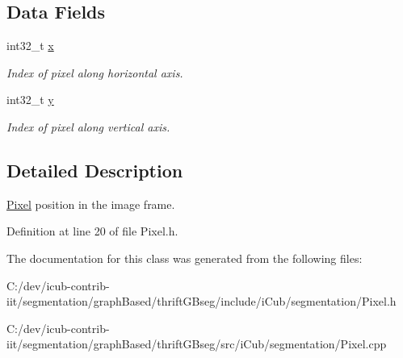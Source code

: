 \subsection*{Data Fields}
\begin{DoxyCompactItemize}
\item 
int32\+\_\+t \hyperlink{classyarp_1_1sig_1_1Pixel_a4d6a5b0c693035c4012aa15e8f8b4b64}{x}\label{classyarp_1_1sig_1_1Pixel_a4d6a5b0c693035c4012aa15e8f8b4b64}

\begin{DoxyCompactList}\small\item\em Index of pixel along horizontal axis. \end{DoxyCompactList}\item 
int32\+\_\+t \hyperlink{classyarp_1_1sig_1_1Pixel_a2ac1d9f1602f323fb9ca9fe62541aeb2}{y}\label{classyarp_1_1sig_1_1Pixel_a2ac1d9f1602f323fb9ca9fe62541aeb2}

\begin{DoxyCompactList}\small\item\em Index of pixel along vertical axis. \end{DoxyCompactList}\end{DoxyCompactItemize}


\subsection{Detailed Description}
\hyperlink{classyarp_1_1sig_1_1Pixel}{Pixel} position in the image frame. 

Definition at line 20 of file Pixel.\+h.



The documentation for this class was generated from the following files\+:\begin{DoxyCompactItemize}
\item 
C\+:/dev/icub-\/contrib-\/iit/segmentation/graph\+Based/thrift\+G\+Bseg/include/i\+Cub/segmentation/Pixel.\+h\item 
C\+:/dev/icub-\/contrib-\/iit/segmentation/graph\+Based/thrift\+G\+Bseg/src/i\+Cub/segmentation/Pixel.\+cpp\end{DoxyCompactItemize}
